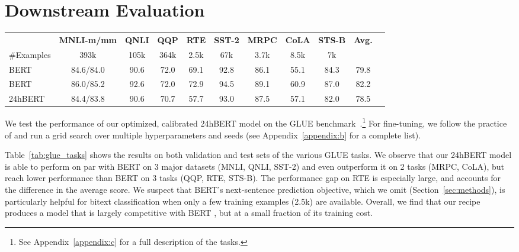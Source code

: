 \documentclass[11pt]{article}
\newcommand{\bertbase}{BERT }
\newcommand{\bertlarge}{BERT }
\begin{document}
 \section{Downstream Evaluation} \label{sec:tasks_eval}

\begin{table*}[t]
\centering
\small
\begin{tabular}{@{}lcccccccccc@{}}
\toprule
& \bf MNLI-m/mm & \bf QNLI & \bf QQP & \bf RTE & \bf SST-2 & \bf MRPC & \bf CoLA & \bf STS-B & \bf Avg. \\
\#Examples & 393k & 105k & 364k & 2.5k & 67k & 3.7k & 8.5k & 7k &  \\
\midrule 
\bertbase    & 84.6/84.0 & 90.6 & 72.0 & 69.1 & 92.8 & 86.1 & 55.1 & 84.3 & 79.8 \\
\bertlarge   & 86.0/85.2 & 92.6 & 72.0 & 72.9 & 94.5 & 89.1 & 60.9 & 87.0 & 82.2 \\
24hBERT      & 84.4/83.8 & 90.6 & 70.7 & 57.7 & 93.0 & 87.5 & 57.1 & 82.0 & 78.5 \\
\bottomrule
\end{tabular}
\caption{
Performance on GLUE test sets.
All models are fine-tuned using the same hyperparameter space.
}
\label{tab:glue_tasks}
\end{table*}
 
We test the performance of our optimized, calibrated 24hBERT model on the GLUE benchmark~\cite{wang-etal-2018-glue}.\footnote{See Appendix~\ref{appendix:c} for a full description of the tasks.}
For fine-tuning, we follow the practice of \citet{Liu2019RoBERTaAR} and run a grid search over multiple hyperparameters and seeds (see Appendix~\ref{appendix:b} for a complete list).

Table~\ref{tab:glue_tasks} shows the results on both validation and test sets of the various GLUE tasks.
We observe that our 24hBERT model is able to perform on par with \bertbase on 3 major datasets (MNLI, QNLI, SST-2) and even outperform it on 2 tasks (MRPC, CoLA), but reach lower performance than \bertbase on 3 tasks (QQP, RTE, STS-B).
The performance gap on RTE is especially large, and accounts for the difference in the average score.
We suspect that BERT's next-sentence prediction objective, which we omit (Section~\ref{sec:methods}), is particularly helpful for bitext classification when only a few training examples (2.5k) are available.
Overall, we find that our recipe produces a model that is largely competitive with \bertbase, but at a small fraction of its training cost.
\end{document}

